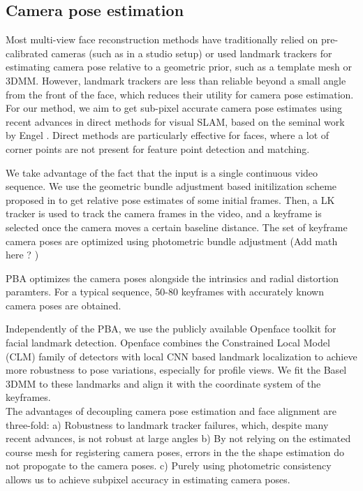 \documentclass[10pt,twocolumn,letterpaper]{article}
\begin{document}
\subsection{Camera pose estimation} \label{sec:PBA}
Most multi-view face reconstruction methods have traditionally relied on pre-calibrated cameras (such as in a studio setup) or used landmark trackers for estimating camera pose relative to a geometric prior, such as a template mesh or 3DMM. However, landmark trackers are less than reliable beyond a small angle from the front of the face, which reduces their utility for camera pose estimation.  For our method, we aim to get sub-pixel accurate camera pose estimates using recent advances in direct methods for visual SLAM, based on the seminal work by Engel \etal \cite{engel2018direct,engel2014lsd}. Direct methods are particularly effective for faces, where a lot of corner points are not present for feature point detection and matching.

We take advantage of the fact that the input is a single continuous video sequence. We use the geometric bundle adjustment based initilization scheme proposed in \cite{ham2017monocular} to get relative pose estimates of some initial frames. Then, a LK tracker is used to track the camera frames in the video, and a keyframe is selected once the camera moves a certain baseline distance. The set of keyframe camera poses are optimized using photometric bundle adjustment (Add math here ? ) 


PBA optimizes the camera poses alongside the intrinsics and radial distortion paramters. For a typical sequence, 50-80 keyframes with accurately known camera poses are obtained.


Independently of the PBA, we use the publicly available Openface toolkit \cite{baltrusaitis2018openface} for facial landmark detection. Openface combines the Constrained Local Model (CLM) family of detectors with local CNN based landmark localization to achieve more robustness to pose variations, especially for profile views. We fit the Basel 3DMM \cite{blanz1999morphable} to these landmarks and align it with the coordinate system of the keyframes.\\

The advantages of decoupling camera pose estimation and face alignment are three-fold: a) Robustness to landmark tracker failures, which, despite many recent advances, is not robust at large angles  b) By not relying on the estimated course mesh for registering camera poses, errors in the the shape estimation do not propogate to the camera poses. c) Purely using photometric consistency allows us to achieve subpixel accuracy in estimating camera poses. 
\end{document}
